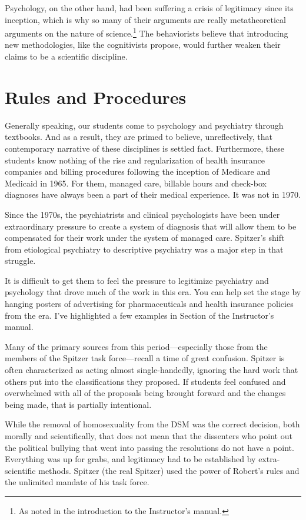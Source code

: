 \begin{refsection}
Psychology, on the other hand, had been suffering a crisis of legitimacy since its inception, which is why so many of their arguments are really metatheoretical arguments on the nature of science.\footnote{As noted in the introduction to the Instructor’s manual.} The behaviorists believe that introducing new methodologies, like the cognitivists propose, would further weaken their claims to be a scientific discipline. 

\section{Rules and Procedures}
\label{rulesandprocedures}

Generally speaking, our students come to psychology and psychiatry through textbooks. And as a result, they are primed to believe, unreflectively, that contemporary narrative of these disciplines is settled fact. Furthermore, these students know nothing of the rise and regularization of health insurance companies and billing procedures following the inception of Medicare and Medicaid in 1965. For them, managed care, billable hours and check-box diagnoses have always been a part of their medical experience. It was not in 1970. 

Since the 1970s, the psychiatrists and clinical psychologists have been under extraordinary pressure to create a system of diagnosis that will allow them to be compensated for their work under the system of managed care. Spitzer's shift from etiological psychiatry to descriptive psychiatry was a major step in that struggle. 

It is difficult to get them to feel the pressure to legitimize psychiatry and psychology that drove much of the work in this era. You can help set the stage by hanging posters of advertising for pharmaceuticals and health insurance policies from the era. I've highlighted a few examples in Section  of the Instructor's manual. 

Many of the primary sources from this period---especially those from the members of the Spitzer task force---recall a time of great confusion. Spitzer is often characterized as acting almost single-handedly, ignoring the hard work that others put into the classifications they proposed. If students feel confused and overwhelmed with all of the proposals being brought forward and the changes being made, that is partially intentional. 

While the removal of homosexuality from the DSM was the correct decision, both morally and scientifically, that does not mean that the dissenters who point out the political bullying that went into passing the resolutions do not have a point. Everything was up for grabs, and legitimacy had to be established by extra-scientific methods. Spitzer (the real Spitzer) used the power of Robert's rules and the unlimited mandate of his task force. 


\end{refsection}
